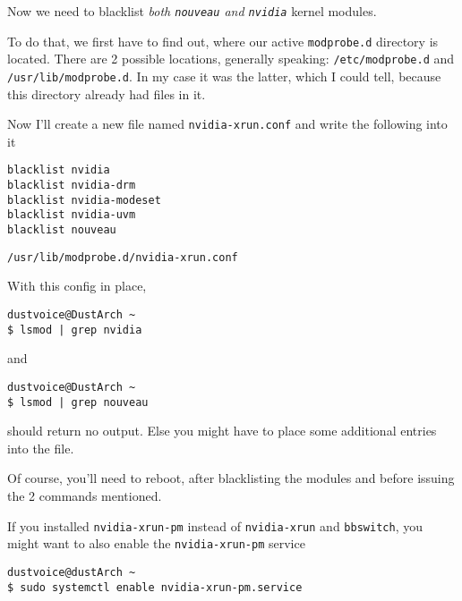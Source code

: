 \documentclass[10pt]{dustdoc}
\begin{document}
Now we need to blacklist \emph{both \texttt{nouveau} and \texttt{nvidia}} kernel modules.

To do that, we first have to find out, where our active \texttt{modprobe.d} directory is located.
There are 2 possible locations, generally speaking: \texttt{/etc/modprobe.d} and \texttt{/usr/lib/modprobe.d}.
In my case it was the latter, which I could tell, because this directory already had files in it.

Now I’ll create a new file named \texttt{nvidia-xrun.conf} and write the following into it

\begin{mintedlisting}
    \begin{verbatim}
blacklist nvidia
blacklist nvidia-drm
blacklist nvidia-modeset
blacklist nvidia-uvm
blacklist nouveau
    \end{verbatim}

    \caption{\texttt{/usr/lib/modprobe.d/nvidia-xrun.conf}}
\end{mintedlisting}

With this config in place,

\begin{verbatim}
dustvoice@DustArch ~
$ lsmod | grep nvidia
\end{verbatim}

\noindent
and

\begin{verbatim}
dustvoice@DustArch ~
$ lsmod | grep nouveau
\end{verbatim}

\noindent
should return no output.
Else you might have to place some additional entries into the file.

\begin{NOTE}
    Of course, you’ll need to reboot, after blacklisting the modules and before issuing the 2 commands mentioned.
\end{NOTE}

\begin{NOTE}
    If you installed \texttt{nvidia-xrun-pm} instead of \texttt{nvidia-xrun} and \texttt{bbswitch}, you might want to also enable the \texttt{nvidia-xrun-pm} service

    \begin{verbatim}
dustvoice@dustArch ~
$ sudo systemctl enable nvidia-xrun-pm.service
    \end{verbatim}
\end{NOTE}
\end{document}
